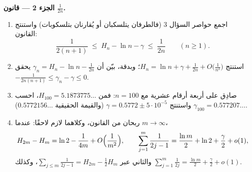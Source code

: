 \begin{problem}[{مسألة نهاية الأسبوع --- $H_n = \ln n + \gamma +
\frac{1}{2n} + O(n^{-2})$، وإعادة ترتيب $1 - \frac12 +
\frac13 - \dots$ إلى $\frac{\ln 2}{2}$}]
\medskip
\noindent\textbf{الجزء 2 --- قانون $\frac{1}{2n}$.}
\begin{enumerate}[resume]
  \item اجمع حواصر السؤال 3 (فالطرفان يتلسكبان أو
        يُقارنان بتلسكوبات) واستنتج القانون:
        \[
        \frac{1}{2(n+1)} \;\leq\; H_n - \ln n - \gamma \;\leq\;
        \frac{1}{2n} \qquad (n \geq 1).
        \]
  \item استنتج $H_n = \ln n + \gamma + \frac{1}{2n} +
        O\bigl(\frac{1}{n^2}\bigr)$؛ وبدقة، بيّن أن
        $\gamma_n = H_n - \ln n - \frac{1}{2n}$ يحقق
        $-\frac{1}{2n(n+1)} \leq \gamma_n - \gamma \leq 0$.
  \item صادِق على أربعة أرقام عشرية مع $n = 100$: فمن $H_{100} =
        5.1873775\dots$، احسب $\gamma_{100} = 0.577207\dots$
        واستنتج $\gamma = 0.5772 \pm 5\cdot10^{-5}$ (والقيمة
        الحقيقية $0.5772156\dots$).
  \item ربحان من القانون، وكلاهما لازم لاحقًا: عندما $m \to
        \infty$،
        \[
        H_{2m} - H_m = \ln 2 - \frac{1}{4m} +
        O\Bigl(\frac{1}{m^2}\Bigr),
        \qquad
        \sum_{j=1}^{m} \frac{1}{2j-1} = \frac{\ln m}{2} + \ln 2
        + \frac\gamma2 + o(1) ,
        \]
        والثاني عبر $\sum_{j \leq m} \frac{1}{2j-1} = H_{2m}
        - \frac12 H_m$، وكذلك $\sum_{j=1}^{m}
        \frac{1}{2j} = \frac{\ln m}{2} + \frac\gamma2 + o(1)$.
\end{enumerate}


\end{problem}
